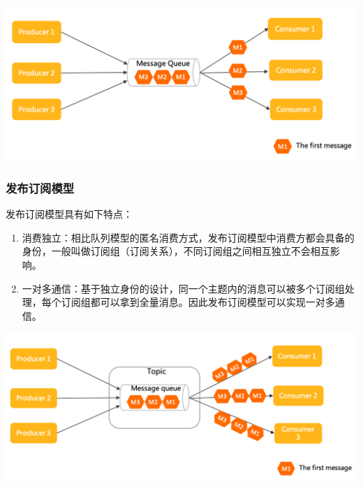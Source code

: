 \documentclass[11pt, a4paper, oneside, fontset=none]{ctexbook}
\begin{document}
\begin{center}
  \begin{minipage}{\textwidth}
    \center
    \includegraphics[width=\textwidth]{picture/点对点模型.png}
    \captionsetup{hypcap=false}
    \label{fig:点对点模型}
  \end{minipage}
\end{center}

\subsubsection{发布订阅模型}
发布订阅模型具有如下特点：
\begin{enumerate}
  \item 消费独立：相比队列模型的匿名消费方式，发布订阅模型中消费方都会具备的身份，一般叫做订阅组（订阅关系），不同订阅组之间相互独立不会相互影响。
  \item 一对多通信：基于独立身份的设计，同一个主题内的消息可以被多个订阅组处理，每个订阅组都可以拿到全量消息。因此发布订阅模型可以实现一对多通信。
\end{enumerate}

\begin{center}
  \begin{minipage}{\textwidth}
    \center
    \includegraphics[width=\textwidth]{picture/发布订阅模型.png}
    \captionsetup{hypcap=false}
    \label{fig:发布订阅模型}
  \end{minipage}
\end{center}
\end{document}
